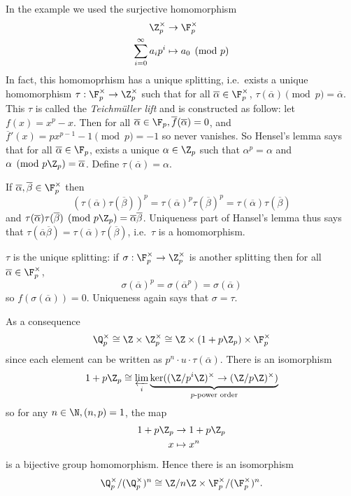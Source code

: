 \documentclass[a4paper]{article}
\begin{document}
In the example we used the surjective homomorphism
\begin{align*}
  \Z_p^\times &\to \F_p^\times \\
  \sum_{i = 0}^\infty a_i p^i &\mapsto a_0 \pmod p
\end{align*}
In fact, this homomoprhism has a unique splitting, i.e.\ exists a unique homomorphism \(\tau: \F_p^\times \to \Z_p^\times\) such that for all \(\overline \alpha \in \F_p^\times\), \(\tau(\overline \alpha) \pmod p = \overline \alpha\). This \(\tau\) is called the \emph{Teichmüller lift} and is constructed as follow: let \(f(x) = x^p - x\). Then for all \(\overline \alpha \in \F_p, \overline f(\overline \alpha) = 0\), and \(\overline f'(x) = px^{p - 1} - 1 \pmod p = -1\) so never vanishes. So Hensel's lemma says that for all \(\overline \alpha \in \F_p\), exists a unique \(\alpha \in \Z_p\) such that \(\alpha^p = \alpha\) and \(\alpha \pmod{p\Z_p} = \overline \alpha\). Define \(\tau(\overline \alpha) = \alpha\).

If \(\overline \alpha, \overline \beta \in \F_p^\times\) then
\[
  (\tau(\overline \alpha) \tau(\overline \beta))^p
  = \tau(\overline \alpha)^p \tau(\overline \beta)^p
  = \tau(\overline \alpha) \tau(\overline \beta)
\]
and \(\tau(\overline \alpha) \tau(\overline \beta) \pmod{p\Z_p} = \overline \alpha \overline \beta\). Uniqueness part of Hansel's lemma thus says that \(\tau(\overline \alpha \overline \beta) = \tau(\overline \alpha) \tau(\overline \beta)\), i.e.\ \(\tau\) is a homomorphism.

\(\tau\) is the unique splitting: if \(\sigma: \F_p^\times \to \Z_p^\times\) is another splitting then for all \(\overline \alpha \in \F_p^\times\),
\[
  \sigma(\overline \alpha)^p = \sigma(\overline \alpha^p) = \sigma(\overline \alpha)
\]
so \(f(\sigma(\overline \alpha)) = 0\). Uniqueness again says that \(\sigma = \tau\).

As a consequence
\[
  \Q_p^\times \cong \Z \times \Z_p^\times \cong \Z \times (1 + p \Z_p) \times \F_p^\times
\]
since each element can be written as \(p^n \cdot u \cdot \tau(\overline \alpha)\). There is an isomorphism
\[
  1 + p \Z_p \cong \varprojlim_i \underbrace{\ker ((\Z/p^i\Z)^\times \to (\Z/p\Z)^\times)}_{\text{\(p\)-power order}}
\]
so for any \(n \in \N, (n, p) = 1\), the map
\begin{align*}
  1 + p \Z_p &\to 1 + p\Z_p \\
  x &\mapsto x^n
\end{align*}
is a bijective group homomorphism. Hence there is an isomorphism
\[
  \Q_p^\times /(\Q_p^\times)^n \cong \Z/n\Z \times \F_p^\times/(\F_p^\times)^n.
\]
\end{document}
